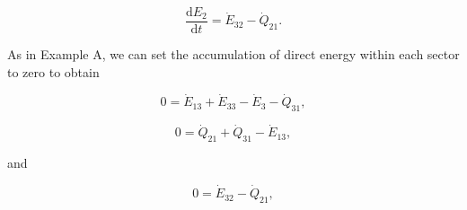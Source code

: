 \begin{equation} \label{eq:CV_E_dot_2}
	\frac{\mathrm{d}E_{2}}{\mathrm{d}t} 	 = \dot{E}_{32} - \dot{Q}_{21}.
\end{equation}

As in Example A, we can set the accumulation of direct energy within each sector to zero to obtain

\begin{equation} \label{eq:CV_E_dot_3_SS}
	0 =\dot{E}_{13} + \dot{E}_{33} - \dot{E}_{3} - \dot{Q}_{31},
\end{equation}

\begin{equation} \label{eq:CV_E_dot_1_SS}
	0 =  \dot{Q}_{21} + \dot{Q}_{31} - \dot{E}_{13},
\end{equation}

\noindent and 

\begin{equation} \label{eq:CV_E_dot_2_SS}
	0 =\dot{E}_{32} - \dot{Q}_{21},
\end{equation}

%
%
%
%
%
%

%
%
%

